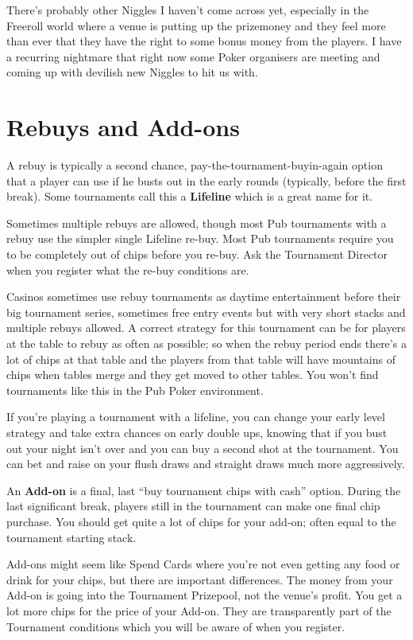 There's probably other Niggles I haven't come across yet,
especially in the Freeroll world where a venue is putting up the
prizemoney and they feel more than ever that they have the right
to some bonus money from the players. I have a recurring
nightmare that right now some Poker organisers are meeting and 
coming up with devilish new Niggles to hit us with.

\section{Rebuys and Add-ons}

A rebuy is typically a second chance, pay-the-tournament-buyin-again
option that a player can use if he busts out in the early rounds
(typically, before the first break). Some tournaments call this a
\textbf{Lifeline} which is a great name for it.

Sometimes multiple rebuys are allowed, though most Pub tournaments
with a rebuy use the simpler single Lifeline re-buy. Most Pub
tournaments require you to be completely out of chips before you
re-buy. Ask the Tournament Director when you register what
the re-buy conditions are.

Casinos sometimes use rebuy tournaments as daytime entertainment
before their big tournament series, sometimes free entry events
but with very short stacks and multiple rebuys allowed. A correct
strategy for this tournament can be for players at the table
to rebuy as often as possible; so when the rebuy period ends there's
a lot of chips at that table and the players from that table will
have mountains of chips when tables merge and they get moved to
other tables. You won't find tournaments like this in the Pub Poker
environment.

If you're playing a tournament with a lifeline, you can change
your early level strategy and take extra chances on early
double ups, knowing that if you bust out your night isn't over and
you can buy a second shot at the tournament. You can bet and raise
on your flush draws and straight draws much more aggressively.

An \textbf{Add-on} is a final, last ``buy tournament chips with cash''
option. During the last significant break, players still
in the tournament can make one final chip purchase. You should get
quite a lot of chips for your add-on; often equal to the tournament
starting stack.

Add-ons might seem like Spend Cards where you're not even
getting any food or drink for your chips, but there are important
differences. The money from your Add-on is going into the Tournament
Prizepool, not the venue's profit. You get a lot more chips for
the price of your Add-on. They are transparently part of the
Tournament conditions which you will be aware of when you register.

